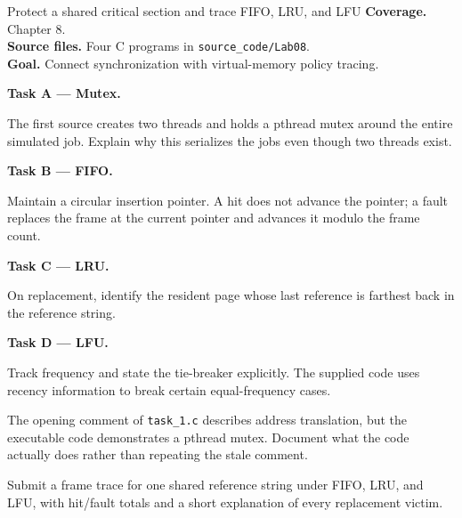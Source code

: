 \begin{labproject}{Protect a shared critical section and trace FIFO, LRU, and LFU}
\textbf{Coverage.} Chapter 8.\\
\textbf{Source files.} Four C programs in \texttt{source\_code/Lab08}.\\
\textbf{Goal.} Connect synchronization with virtual-memory policy tracing.

\medskip\noindent\textbf{Task A --- Mutex.}\par
The first source creates two threads and holds a pthread mutex around the entire simulated job. Explain why this serializes the jobs even though two threads exist.

\medskip\noindent\textbf{Task B --- FIFO.}\par
Maintain a circular insertion pointer. A hit does not advance the pointer; a fault replaces the frame at the current pointer and advances it modulo the frame count.

\medskip\noindent\textbf{Task C --- LRU.}\par
On replacement, identify the resident page whose last reference is farthest back in the reference string.

\medskip\noindent\textbf{Task D --- LFU.}\par
Track frequency and state the tie-breaker explicitly. The supplied code uses recency information to break certain equal-frequency cases.

\begin{debugtask}
The opening comment of \texttt{task\_1.c} describes address translation, but the executable code demonstrates a pthread mutex. Document what the code actually does rather than repeating the stale comment.
\end{debugtask}
\end{labproject}

\begin{labdeliverable}
Submit a frame trace for one shared reference string under FIFO, LRU, and LFU, with hit/fault totals and a short explanation of every replacement victim.
\end{labdeliverable}
